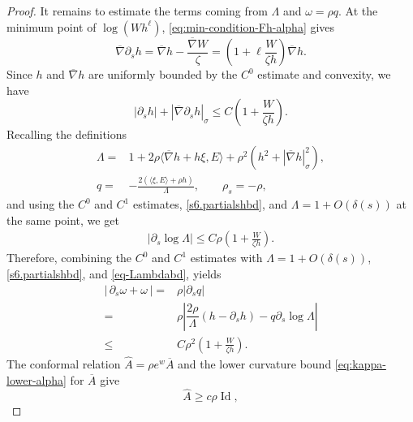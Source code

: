 \documentclass[11pt, reqno]{amsart}
\theoremstyle{remark}
\theoremstyle{definition}
\numberwithin{equation}{section}
\newcommand{\Id}{\operatorname{Id}}
\begin{document}
\begin{proof}
It remains to estimate the terms coming from $\Lambda$ and $\omega=\rho q$.
At the minimum point of $\log(Wh^\ell)$, \eqref{eq:min-condition-Fh-alpha} gives
\begin{equation*}
        \overline{\nabla} \partial_s h
        =\overline{\nabla} h-\frac{\overline{\nabla} W}{\zeta}
        =\left(1+\ell\frac{W}{\zeta h}\right)\overline{\nabla} h.
\end{equation*}
Since $h$ and $\overline{\nabla} h$ are uniformly bounded by the $C^0$ estimate and convexity, we have
\begin{equation}
    |\partial_s h|+|\overline{\nabla}\partial_s h|_{\sigma}\leq C\left( 1+\dfrac{W}{\zeta h} \right).
    \label{s6.partialshbd}
\end{equation}
Recalling the definitions
\begin{align*}
        \Lambda=&1+2\rho \langle \overline{\nabla}h+h\xi,E \rangle+\rho^2(h^2+|\overline{\nabla}h|_{\sigma}^2), \\
        q=&-\frac{2(\langle \xi,E \rangle+\rho h)}{\Lambda},\qquad \rho_s=-\rho,
\end{align*}
and using the $C^0$ and $C^1$ estimates, \eqref{s6.partialshbd}, and $\Lambda=1+O(\delta(s))$ at the same point, we get
\begin{align}
    |\partial_s\log \Lambda| %
    \le C\rho\left(1+\frac{W}{\zeta h}\right).  \label{eq-Lambdabd}
\end{align}
Therefore, combining the $C^0$ and $C^1$ estimates with $\Lambda=1+O(\delta(s))$, \eqref{s6.partialshbd}, and \eqref{eq-Lambdabd}, yields
\begin{align*}
        |\,\partial_s\omega+\omega\,|
        =&\rho|\partial_s q|\\
        =&  \rho\left| \dfrac{2\rho}{\Lambda}(h-\partial_s h)-q\partial_s\log\Lambda \right|\\
        \le & C \rho^2 \left(1+\frac{W}{\zeta h}\right).
\end{align*}
The conformal relation $\widehat A=\rho e^w\overline A$ and the lower curvature bound \eqref{eq:kappa-lower-alpha} for $\overline{A}$ give
\begin{equation*}
        \widehat A\ge c\rho\Id , 

\end{equation*}
\end{proof}
\end{document}
